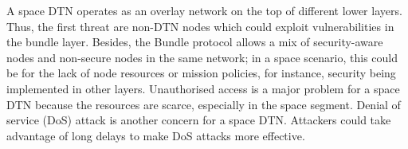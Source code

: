  A space DTN operates as an overlay network on the top of different lower layers. Thus, the first threat are non-DTN nodes which could exploit vulnerabilities in the bundle layer. Besides, the Bundle protocol allows a mix of security-aware nodes and non-secure nodes in the same network; in a space scenario, this could be for the lack of node resources or mission policies, for instance, security being implemented in other layers. Unauthorised access is a major problem for a space DTN because the resources are scarce, especially in the space segment. Denial of service (DoS) attack is another concern for a space DTN. Attackers could take advantage of long delays to make DoS attacks more effective. 
 
 
 
 



